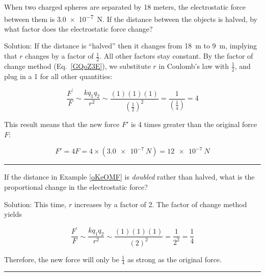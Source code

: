 \documentclass[dvipsnames]{article}
\begin{document}
\begin{example} \label{oKeOMF}
When two charged spheres are separated by 18 meters, the electrostatic force between them is \SI{3.0e-7}{N}. If the distance between the objects is halved, by what factor does the electrostatic force change?
\end{example}

Solution: If the distance is ``halved'' then it changes from \SI{18}{m} to \SI{9}{m}, implying that $r$ changes by a factor of $\frac{1}{2}$. All other factors stay constant. By the factor of change method (Eq.~\ref{GQoZ3E}), we substitute $r$ in Coulomb's law with $\frac{1}{2}$, and plug in a 1 for all other quantities:

\begin{equation*}
    \frac{F^{\prime}}{F} \sim \frac{k q_1 q_2}{r^2} \sim \frac{(1)(1)(1)}{\left(\frac{1}{2}\right)^2} = \frac{1}{\left(\frac{1}{4}\right)} = 4
\end{equation*}

This result means that the new force $F'$ is 4 times greater than the original force $F$:

\begin{equation*}
    F' = 4 F = 4 \times \left(\SI{3.0e-7}{N}\right) = \SI{12e-7}{N}
\end{equation*}

\hrule

\begin{example} 
If the distance in Example \ref{oKeOMF} is \textit{doubled} rather than halved, what is the proportional change in the electrostatic force?
\end{example}

Solution: This time, $r$ increases by a factor of 2. The factor of change method yields

\begin{equation*}
    \frac{F^{\prime}}{F} \sim \frac{k q_1 q_2}{r^2} \sim \frac{(1)(1)(1)}{(2)^2} = \frac{1}{2^2} =\frac{1}{4}
\end{equation*}

Therefore, the new force will only be $\frac{1}{4}$ as strong as the original force.

\vspace{1em}
\hrule
\end{document}
